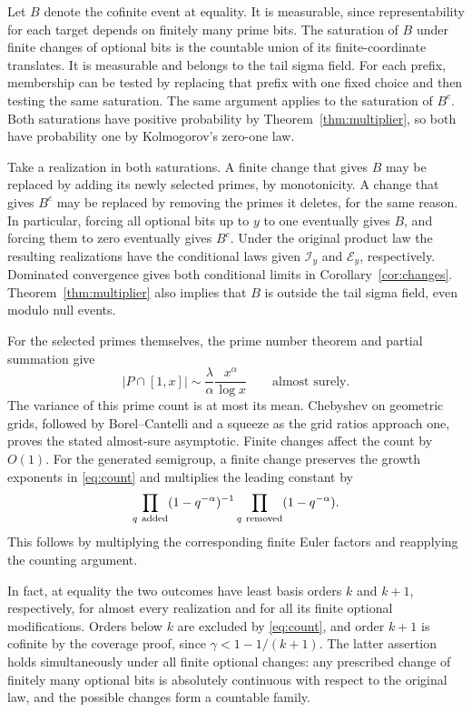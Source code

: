 \documentclass[11pt]{article}
\begin{document}
Let \(B\) denote the cofinite event at equality. It is
measurable, since representability for each target depends
on finitely many prime bits. The saturation of \(B\) under
finite changes of optional bits is the countable union of
its finite-coordinate translates. It is measurable and belongs
to the tail sigma field. For each prefix, membership can be
tested by replacing that prefix with one fixed choice and then
testing the same saturation. The same argument applies to the
saturation of \(B^c\). Both saturations have positive probability
by Theorem~\ref{thm:multiplier}, so both have probability one
by Kolmogorov's zero-one law.

Take a realization in both saturations. A finite change that
gives \(B\) may be replaced by adding its newly selected primes,
by monotonicity. A change that gives \(B^c\) may be replaced
by removing the primes it deletes, for the same reason.
In particular, forcing all optional bits up to \(y\) to one
eventually gives \(B\), and forcing them to zero eventually
gives \(B^c\). Under the original product law the resulting
realizations have the conditional laws given \(\mathcal I_y\)
and \(\mathcal E_y\), respectively. Dominated convergence gives
both conditional limits in Corollary~\ref{cor:changes}.
Theorem~\ref{thm:multiplier} also implies that \(B\) is outside
the tail sigma field, even modulo null events.

For the selected primes themselves, the prime number theorem
and partial summation give
\[
 |P\cap[1,x]|\sim \frac{\lambda}{\alpha}\frac{x^\alpha}{\log x}
 \qquad\text{almost surely}.
\]
The variance of this prime count is at most its mean. Chebyshev
on geometric grids, followed by Borel--Cantelli and a squeeze
as the grid ratios approach one, proves the stated almost-sure
asymptotic. Finite changes affect the count by \(O(1)\).
For the generated semigroup, a finite change preserves the
growth exponents in \eqref{eq:count} and multiplies the
leading constant by
\[
        \prod_{q\ {\rm added}}(1-q^{-\alpha})^{-1}
                 \prod_{q\ {\rm removed}}(1-q^{-\alpha}).
\]
This follows by multiplying the corresponding finite Euler
factors and reapplying the counting argument.

In fact, at equality the two outcomes have least basis orders
\(k\) and \(k+1\), respectively, for almost every realization
and for all its finite optional modifications. Orders below
\(k\) are excluded by \eqref{eq:count}, and order \(k+1\) is
cofinite by the coverage proof, since \(\gamma<1-1/(k+1)\).
The latter assertion holds simultaneously under all finite
optional changes: any prescribed change of finitely many optional
bits is absolutely continuous with respect to the original law,
and the possible changes form a countable family.
\end{document}
